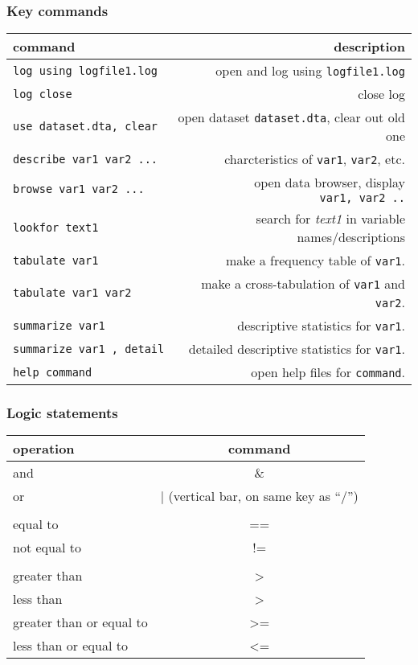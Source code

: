 \documentclass[
]{article}
\begin{document}
\hypertarget{key-commands}{%
\subsubsection*{Key commands}\label{key-commands}}

\begin{longtable}[]{@{}lr@{}}
\toprule
command & description \\
\midrule
\endhead
\texttt{log\ using\ logfile1.log} & open and log using
\texttt{logfile1.log} \\
\texttt{log\ close} & close log \\
\texttt{use\ dataset.dta,\ clear} & open dataset \texttt{dataset.dta},
clear out old one \\
\texttt{describe\ var1\ var2\ ...} & charcteristics of \texttt{var1},
\texttt{var2}, etc. \\
\texttt{browse\ var1\ var2\ ...} & open data browser, display
\texttt{var1,\ var2\ ..} \\
\texttt{lookfor\ text1} & search for \emph{text1} in variable
names/descriptions \\
\texttt{tabulate\ var1} & make a frequency table of \texttt{var1}. \\
\texttt{tabulate\ var1\ var2} & make a cross-tabulation of \texttt{var1}
and \texttt{var2}. \\
\texttt{summarize\ var1} & descriptive statistics for \texttt{var1}. \\
\texttt{summarize\ var1\ ,\ detail} & detailed descriptive statistics
for \texttt{var1}. \\
\texttt{help\ command} & open help files for \texttt{command}. \\
\bottomrule
\end{longtable}

\hypertarget{logic-statements}{%
\subsubsection*{Logic statements}\label{logic-statements}}

\begin{longtable}[]{@{}lc@{}}
\toprule
operation & command \\
\midrule
\endhead
and & \& \\
or & \(|\) (vertical bar, on same key as ``/'') \\
& \\
equal to & == \\
not equal to & != \\
& \\
greater than & \textgreater{} \\
less than & \textgreater{} \\
greater than or equal to & \textgreater= \\
less than or equal to & \textless= \\
\bottomrule
\end{longtable}
\end{document}
